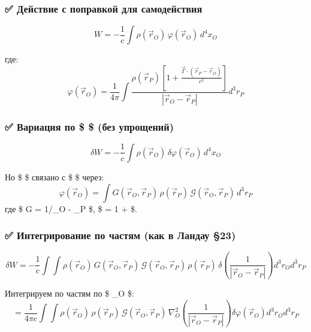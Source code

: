 \documentclass[11pt]{article}
\begin{document}
\subsubsection{✅ Действие с поправкой для
самодействия}\label{ux434ux435ux439ux441ux442ux432ux438ux435-ux441-ux43fux43eux43fux440ux430ux432ux43aux43eux439-ux434ux43bux44f-ux441ux430ux43cux43eux434ux435ux439ux441ux442ux432ux438ux44f}

\[
W = -\frac{1}{c} \int \rho(\vec{r}_O) \, \varphi(\vec{r}_O) \, d^4x_O
\]

где: \[
\varphi(\vec{r}_O) = \frac{1}{4\pi} \int \frac{\rho(\vec{r}_P) \left[ 1 + \frac{\vec{\Gamma} \cdot (\vec{r}_P - \vec{r}_O)}{c^2} \right]}{|\vec{r}_O - \vec{r}_P|} d^3r_P
\]

\subsubsection{\texorpdfstring{✅ Вариация по \$ \varphi \$ (без
упрощений)}{✅ Вариация по \$ \$ (без упрощений)}}\label{ux432ux430ux440ux438ux430ux446ux438ux44f-ux43fux43e-ux431ux435ux437-ux443ux43fux440ux43eux449ux435ux43dux438ux439}

\[
\delta W = -\frac{1}{c} \int \rho(\vec{r}_O) \, \delta \varphi(\vec{r}_O) \, d^4x_O
\]

Но \$ \varphi \$ связано с \$ \rho \$ через: \[
\varphi(\vec{r}_O) = \int G(\vec{r}_O, \vec{r}_P) \, \rho(\vec{r}_P) \, \mathcal{G}(\vec{r}_O, \vec{r}_P) \, d^3r_P
\] где \$ G = 1/\textbar{}\_O - \_P\textbar{} \$, \$
 = 1 + 
\$.

\subsubsection{✅ Интегрирование по частям (как в Ландау
§23)}\label{ux438ux43dux442ux435ux433ux440ux438ux440ux43eux432ux430ux43dux438ux435-ux43fux43e-ux447ux430ux441ux442ux44fux43c-ux43aux430ux43a-ux432-ux43bux430ux43dux434ux430ux443-23}

\[
\delta W = -\frac{1}{c} \int \int \rho(\vec{r}_O) \, G(\vec{r}_O, \vec{r}_P) \, \mathcal{G}(\vec{r}_O, \vec{r}_P) \, \rho(\vec{r}_P) \, \delta \left( \frac{1}{|\vec{r}_O - \vec{r}_P|} \right) d^3r_O d^3r_P
\]

Интегрируем по частям по \$ \_O \$: \[
= \frac{1}{4\pi c} \int \int \rho(\vec{r}_O) \, \rho(\vec{r}_P) \, \mathcal{G}(\vec{r}_O, \vec{r}_P) \, \nabla_O^2 \left( \frac{1}{|\vec{r}_O - \vec{r}_P|} \right) \delta \varphi(\vec{r}_O) d^3r_O d^3r_P
\]
\end{document}
